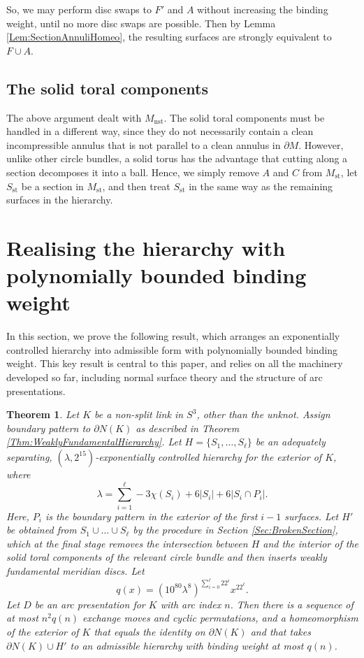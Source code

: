 \documentclass[oneside]{amsart}
\numberwithin{equation}{section}
\theoremstyle{plain}
\newtheorem{theorem}[equation]{Theorem}
\theoremstyle{definition}
\begin{document}
So, we may perform disc swaps to $F'$ and $A$ without increasing the binding weight, until
no more disc swaps are possible. Then by Lemma \ref{Lem:SectionAnnuliHomeo},
the resulting surfaces are strongly equivalent to $F \cup A$.

\subsection{The solid toral components}
The above argument dealt with $M_{\text{nst}}$. The solid toral components must be
handled in a different way, since they do not necessarily contain a clean incompressible annulus that is
not parallel to a clean annulus in $\partial M$.
However, unlike other circle bundles, a solid torus has the advantage that cutting
along a section decomposes it into a ball. Hence, we simply remove $A$ and $C$
from $M_{\text{st}}$, let $S_{\text{st}}$ be a section in $M_{\text{st}}$, and then treat $S_{\text{st}}$ in the same way as
the remaining surfaces in the hierarchy.

\section{Realising the hierarchy with polynomially bounded binding weight}
\label{Sec:PolynomiallyBounded}

In this section, we prove the following result, which arranges an exponentially controlled hierarchy into
admissible form with polynomially bounded binding weight. This key result is central to this
paper, and relies on all the machinery developed so far, including normal surface theory
and the structure of arc presentations.

\begin{theorem}
\label{Thm:PolyBoundExchange}
Let $K$ be a non-split link in $S^3$, other than the unknot. Assign boundary pattern to $\partial N(K)$
as described in Theorem \ref{Thm:WeaklyFundamentalHierarchy}.
Let $H = \{ S_1, \dots, S_\ell \}$ 
be an adequately separating, $(\lambda,2^{15})$-exponentially controlled hierarchy for the exterior of $K$, where
$$\lambda = \sum_{i=1}^\ell -3\chi(S_i) + 6 |S_i| + 6|S_i \cap P_i|.$$
Here, $P_i$ is the boundary pattern
in the exterior of the first $i-1$ surfaces. Let $H'$ be obtained from $S_1 \cup \dots \cup S_\ell$
by the procedure in Section \ref{Sec:BrokenSection}, which at the final stage removes
the intersection between $H$ and the interior of the solid toral components of
the relevant circle bundle and then inserts weakly fundamental meridian discs. Let
$$q(x) = (10^{80} \lambda^8)^{\sum_{i=0}^\ell {22}^i} x^{22^\ell}.$$
Let $D$ be an arc presentation for $K$ with arc index $n$.
Then there is a sequence of at most $n^2 q(n)$ exchange moves and cyclic permutations, and 
a homeomorphism of the exterior of $K$ that equals the identity on $\partial N(K)$ and that
takes $\partial N(K) \cup H'$ to an admissible hierarchy with binding weight at most $q(n)$.
\end{theorem}
\end{document}
